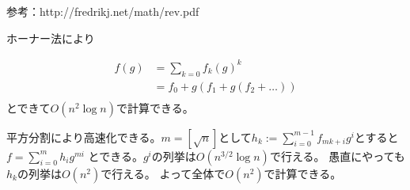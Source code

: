 \documentclass{jsarticle}
\begin{document}
参考：http://fredrikj.net/math/rev.pdf

ホーナー法により

\begin{align}
  f(g)&=\sum_{k=0} f_k(g)^k\\
      &=f_0+g(f_1+g(f_2+\ldots))\\
\end{align}
とできて$O(n^2\log n)$で計算できる。

平方分割により高速化できる。$m=[\sqrt{n}]$として$h_k:=\sum_{i=0}^{m-1} f_{mk+i}g^i$とすると
$f=\sum_{i=0}^m h_i g^{mi}$
とできる。$g^i$の列挙は$O(n^{3/2} \log{n})$で行える。
愚直にやっても$h_k$の列挙は$O(n^{2})$で行える。
よって全体で$O(n^2)$で計算できる。
\end{document}
